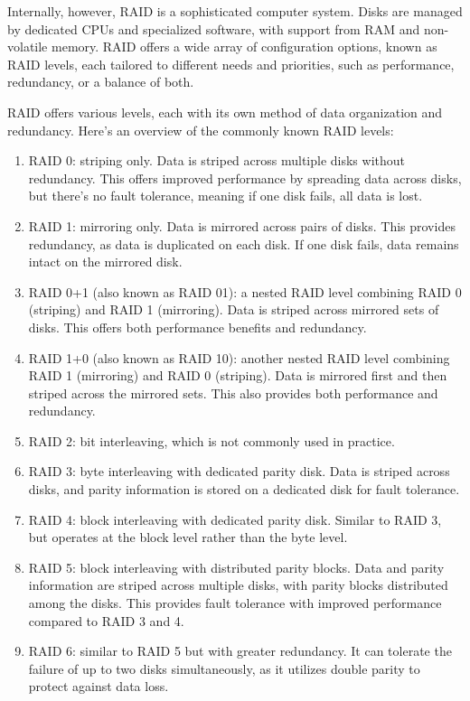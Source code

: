Internally, however, RAID is a sophisticated computer system. 
Disks are managed by dedicated CPUs and specialized software, with support from RAM and non-volatile memory. 
RAID offers a wide array of configuration options, known as RAID levels, each tailored to different needs and priorities, such as performance, redundancy, or a balance of both.

RAID offers various levels, each with its own method of data organization and redundancy. 
Here's an overview of the commonly known RAID levels:
\begin{enumerate}
    \item RAID 0: striping only. 
        Data is striped across multiple disks without redundancy. 
        This offers improved performance by spreading data across disks, but there's no fault tolerance, meaning if one disk fails, all data is lost.
    \item RAID 1: mirroring only. 
        Data is mirrored across pairs of disks. 
        This provides redundancy, as data is duplicated on each disk. 
        If one disk fails, data remains intact on the mirrored disk.
    \item RAID 0+1 (also known as RAID 01): a nested RAID level combining RAID 0 (striping) and RAID 1 (mirroring). 
        Data is striped across mirrored sets of disks. 
        This offers both performance benefits and redundancy.
    \item RAID 1+0 (also known as RAID 10): another nested RAID level combining RAID 1 (mirroring) and RAID 0 (striping). 
        Data is mirrored first and then striped across the mirrored sets. 
        This also provides both performance and redundancy.
    \item RAID 2: bit interleaving, which is not commonly used in practice.
    \item RAID 3: byte interleaving with dedicated parity disk. 
        Data is striped across disks, and parity information is stored on a dedicated disk for fault tolerance.
    \item RAID 4: block interleaving with dedicated parity disk. 
        Similar to RAID 3, but operates at the block level rather than the byte level.
    \item RAID 5: block interleaving with distributed parity blocks. 
        Data and parity information are striped across multiple disks, with parity blocks distributed among the disks. 
        This provides fault tolerance with improved performance compared to RAID 3 and 4.
    \item RAID 6: similar to RAID 5 but with greater redundancy. 
        It can tolerate the failure of up to two disks simultaneously, as it utilizes double parity to protect against data loss.
\end{enumerate}

